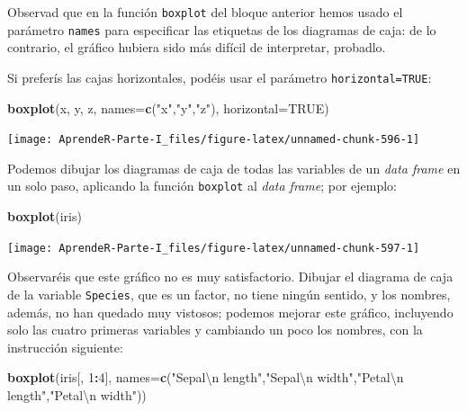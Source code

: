 \documentclass[]{book}
\newenvironment{Shaded}{\begin{snugshade}}{\end{snugshade}}
\newcommand{\CharTok}[1]{\textcolor[rgb]{0.31,0.60,0.02}{#1}}
\newcommand{\DataTypeTok}[1]{\textcolor[rgb]{0.13,0.29,0.53}{#1}}
\newcommand{\DecValTok}[1]{\textcolor[rgb]{0.00,0.00,0.81}{#1}}
\newcommand{\KeywordTok}[1]{\textcolor[rgb]{0.13,0.29,0.53}{\textbf{#1}}}
\newcommand{\NormalTok}[1]{#1}
\newcommand{\OperatorTok}[1]{\textcolor[rgb]{0.81,0.36,0.00}{\textbf{#1}}}
\newcommand{\OtherTok}[1]{\textcolor[rgb]{0.56,0.35,0.01}{#1}}
\newcommand{\StringTok}[1]{\textcolor[rgb]{0.31,0.60,0.02}{#1}}
\theoremstyle{definition}
\theoremstyle{definition}
\theoremstyle{definition}
\theoremstyle{remark}
\begin{document}
Observad que en la función \texttt{boxplot} del bloque anterior hemos usado el parámetro \texttt{names} para especificar las etiquetas de los diagramas de caja: de lo contrario, el gráfico hubiera sido más difícil de interpretar, probadlo.

Si preferís las cajas horizontales, podéis usar el parámetro \texttt{horizontal=TRUE}:

\begin{Shaded}
\begin{Highlighting}[]
\KeywordTok{boxplot}\NormalTok{(x, y, z, }\DataTypeTok{names=}\KeywordTok{c}\NormalTok{(}\StringTok{"x"}\NormalTok{,}\StringTok{"y"}\NormalTok{,}\StringTok{"z"}\NormalTok{), }\DataTypeTok{horizontal=}\OtherTok{TRUE}\NormalTok{)}
\end{Highlighting}
\end{Shaded}

\begin{center}\texttt{[image: AprendeR-Parte-I\_files/figure-latex/unnamed-chunk-596-1]} \end{center}

Podemos dibujar los diagramas de caja de todas las variables de un \emph{data frame} en un solo paso, aplicando la función \texttt{boxplot} al \emph{data frame}; por ejemplo:

\begin{Shaded}
\begin{Highlighting}[]
\KeywordTok{boxplot}\NormalTok{(iris)}
\end{Highlighting}
\end{Shaded}

\begin{center}\texttt{[image: AprendeR-Parte-I\_files/figure-latex/unnamed-chunk-597-1]} \end{center}

Observaréis que este gráfico no es muy satisfactorio. Dibujar el diagrama de caja de la variable \texttt{Species}, que es un factor, no tiene ningún sentido, y los nombres, además, no han quedado muy vistosos; podemos mejorar este gráfico, incluyendo solo las cuatro primeras variables y cambiando un poco los nombres, con la instrucción siguiente:

\begin{Shaded}
\begin{Highlighting}[]
\KeywordTok{boxplot}\NormalTok{(iris[, }\DecValTok{1}\OperatorTok{:}\DecValTok{4}\NormalTok{], }\DataTypeTok{names=}\KeywordTok{c}\NormalTok{(}\StringTok{"Sepal}\CharTok{\textbackslash{}n}\StringTok{ length"}\NormalTok{,}\StringTok{"Sepal}\CharTok{\textbackslash{}n}\StringTok{ width"}\NormalTok{,}\StringTok{"Petal}\CharTok{\textbackslash{}n}\StringTok{ length"}\NormalTok{,}\StringTok{"Petal}\CharTok{\textbackslash{}n}\StringTok{ width"}\NormalTok{))}
\end{Highlighting}
\end{Shaded}
\end{document}
